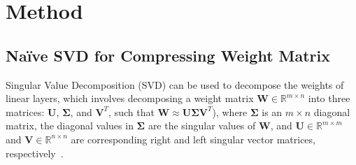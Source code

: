 \section{Method}

\subsection{Naïve SVD for Compressing Weight Matrix}
\label{sec:method-pre}

Singular Value Decomposition (SVD) can be used to decompose the weights of linear layers, which involves decomposing a weight matrix $\mathbf{W}\in \mathbb{R}^{m \times n}$ into three matrices: $\mathbf{U}$, $\mathbf{\Sigma}$, and $\mathbf{V}^T$, such that $\mathbf{W} \approx \mathbf{U} \mathbf{\Sigma} \mathbf{V}^T$), where $\mathbf{\Sigma}$ is an $m \times n$ diagonal matrix, the diagonal values in $\mathbf{\Sigma}$ are the singular values of $\mathbf{W}$, and $\mathbf{U}\in \mathbb{R}^{m \times m}$ and $\mathbf{V}\in \mathbb{R}^{n \times n}$ are corresponding right and left singular vector matrices, respectively~\citep{demmel1997applied}. 

